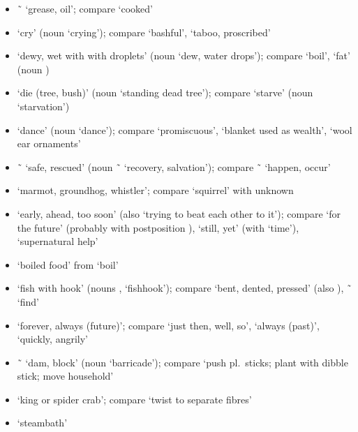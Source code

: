 \begin{morphdesc}[resume*=alphalist]
\begin{enumerate}
\begin{enumerate}
\begin{itemize}
			\item	{} \~\  ‘grease, oil’;
				compare  ‘cooked’
			\item	{} ‘cry’
				(noun  ‘crying’);
				compare  ‘bashful’,
				 ‘taboo, proscribed’
			\item	{} ‘dewy, wet with with droplets’
				(noun  ‘dew, water drops’);
				compare  ‘boil’,
				 ‘fat’ (noun )
			\item	{} ‘die (tree, bush)’
				(noun  ‘standing dead tree’);
				compare  ‘starve’
				(noun  ‘starvation’)
			\item	{} ‘dance’
				(noun  ‘dance’);
				compare  ‘promiscuous’,
				 ‘blanket used as wealth’,
				 ‘wool ear ornaments’
			\item	{} \~\  ‘safe, rescued’
				(noun  \~\  ‘recovery, salvation’);
				compare  \~\  ‘happen, occur’
			\item	{} ‘marmot, groundhog, whistler’;
				compare  ‘squirrel’ with unknown 
			\item	{} ‘early, ahead, too soon’
				(also  ‘trying to beat each other to it’);
				compare  ‘for the future’
					(probably with postposition ),
				 ‘still, yet’ (with  ‘time’),
				 ‘supernatural help’
			\item	{} ‘boiled food’
				from  ‘boil’
			\item	{} ‘fish with hook’
				(nouns ,  ‘fishhook’);
				compare  ‘bent, dented, pressed’
					(also ),
				 \~\  ‘find’
			\item	{} ‘forever, always (future)’;
				compare  ‘just then, well, so’,
				 ‘always (past)’,
				 ‘quickly, angrily’
			\item	{} \~\  ‘dam, block’
				(noun  ‘barricade’);
				compare  ‘push pl.\ sticks; plant with dibble stick; move household’
			\item	{} ‘king or spider crab’;
				compare  ‘twist to separate fibres’
			\item	{} ‘steambath’

\end{itemize}
\end{enumerate}
\end{enumerate}
\end{morphdesc}
